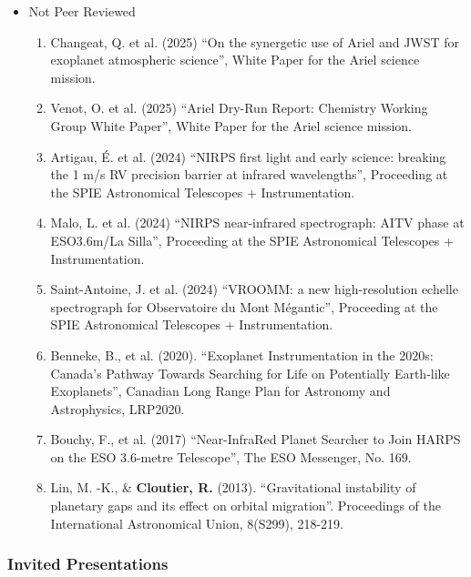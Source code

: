\documentclass[12pt]{article}
\begin{document}
\begin{itemize}

\item Not Peer Reviewed%
\begin{enumerate}
\item Changeat, Q. et al. (2025) ``On the synergetic use of Ariel and JWST for exoplanet atmospheric science'', White Paper for the Ariel science mission.
\item Venot, O. et al. (2025) ``Ariel Dry-Run Report: Chemistry Working Group White Paper'', White Paper for the Ariel science mission.
\item Artigau, \'E. et al. (2024) ``NIRPS first light and early science: breaking the 1 m/s RV precision barrier at infrared wavelengths'', Proceeding at the SPIE Astronomical Telescopes + Instrumentation.
\item Malo, L. et al. (2024) ``NIRPS near-infrared spectrograph: AITV phase at ESO3.6m/La Silla'', Proceeding at the SPIE Astronomical Telescopes + Instrumentation.
\item Saint-Antoine, J. et al. (2024) ``VROOMM: a new high-resolution echelle spectrograph for Observatoire du Mont Mégantic'', Proceeding at the SPIE Astronomical Telescopes + Instrumentation.
\item Benneke, B., et al. (2020). ``Exoplanet Instrumentation in the 2020s: Canada’s Pathway Towards Searching for Life on Potentially Earth-like Exoplanets'', Canadian Long Range Plan for Astronomy and Astrophysics, LRP2020.
\item Bouchy, F., et al. (2017) ``Near-InfraRed Planet Searcher to Join HARPS on the ESO 3.6-metre Telescope'', The ESO Messenger, No. 169.
\item Lin, M. -K., \& {\bf Cloutier, R.} (2013). ``Gravitational instability of planetary gaps and its effect on orbital migration''. Proceedings of the International Astronomical Union, 8(S299), 218-219.
\end{enumerate}
\end{itemize}


\subsubsection*{Invited Presentations}
\end{document}

